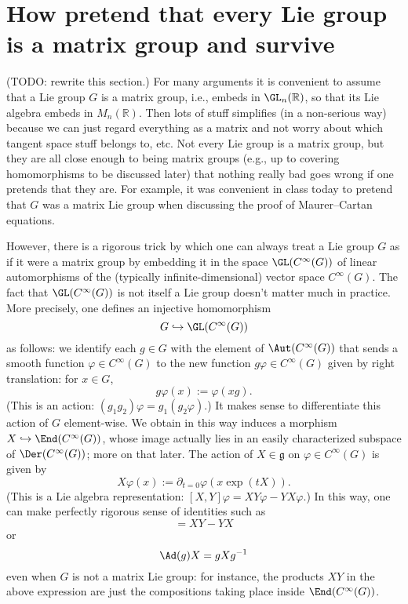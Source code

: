 \documentclass[reqno]{amsart} 
\begin{document}
\section{How pretend that every Lie group is a matrix group and survive\label{sec:pretend-lie-groups-are-matrix-groups}}
\label{sec:org7275cd0}
(TODO: rewrite this section.)
For many arguments it is convenient to assume that
a Lie group $G$ is a matrix group, i.e., embeds in $\GL_n(\mathbb{R})$,
so that its Lie algebra embeds in $M_n(\mathbb{R})$.
Then lots of stuff simplifies
(in a non-serious way) because we can just regard
everything as a matrix and not worry about
which tangent space stuff belongs to, etc.
Not every Lie group is a matrix group,
but they are all close enough to being matrix groups (e.g., up
to covering homomorphisms
to be discussed later) that nothing really bad goes wrong
if one pretends that they are.
For example, it was convenient in class today to pretend that $G$
was a matrix Lie group when discussing the proof of Maurer--Cartan equations.

However, there is a rigorous
trick by which one can always
treat a Lie group $G$ as if it were a matrix group
by embedding it in the space $\GL(C^\infty(G))$
of linear automorphisms
of the (typically infinite-dimensional)
vector space $C^\infty(G)$.
The fact that $\GL(C^\infty(G))$
is not itself a Lie group doesn't matter much in practice.
More precisely, one defines an injective homomorphism
\begin{equation*}
  G \hookrightarrow \GL(C^\infty(G))
\end{equation*}
as follows:
we identify each $g \in G$ with the element of $\Aut(C^\infty(G))$
that sends a smooth function $\varphi \in C^\infty(G)$
to the new function $g \varphi \in C^\infty(G)$
given by right translation:
for $x \in G$,
\begin{equation*}
  g \varphi(x) := \varphi(x g).
\end{equation*}
(This is an action: $(g_1 g_2) \varphi = g_1 (g_2 \varphi)$.)
It makes sense to differentiate this action of $G$ element-wise.
We obtain in this way induces a morphism
$X \hookrightarrow \End(C^\infty(G))$,
whose image actually lies in
an easily characterized
subspace of
$\Der(C^\infty(G))$; more on that later.
The action of $X \in \mathfrak{g}$ on $\varphi \in C^\infty(G)$
is given by
\begin{equation*}
  X \varphi(x) := \partial_{t=0}
  \varphi(x \exp(t X)).
\end{equation*}
(This is a Lie algebra representation:
$[X,Y] \varphi = X Y \varphi - Y X \varphi$.)
In this way, one can make perfectly rigorous sense
of identities such as
\begin{equation*}
  [X,Y] = X Y - Y X
\end{equation*}
or
\begin{equation*}
  \Ad(g) X = g X g^{-1}
\end{equation*}
even when $G$ is not a matrix Lie group:
for instance, the products $X Y$ in the above expression
are just the compositions taking place inside
$\End(C^\infty(G))$.
\end{document}
